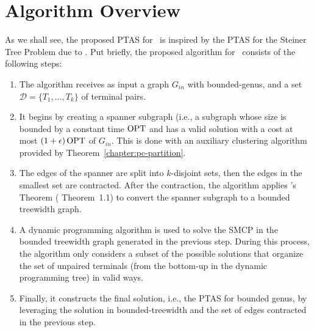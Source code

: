 \section{Algorithm Overview}

As we shall see, the proposed PTAS for \steinercycle\ is inspired by the PTAS for the Steiner Tree Problem due to \cite{Bateni}. Put briefly, the proposed algorithm for \steinercycle\ consists of the following steps:

\begin{enumerate}
    \item The algorithm receives as input a graph \(G_{in}\) with bounded-genus, and a set \(\mathcal{D} = \{T_1, \dots, T_k\}\) of terminal pairs.

    \item It begins by creating a spanner subgraph (i.e., a subgraph whose size is bounded by a constant time \(\operatorname{\textrm{OPT}}\) and has a valid solution with a cost at most \((1 + \epsilon) \operatorname{\textrm{OPT}}\) of \(G_{in}\). This is done with an auxiliary clustering algorithm provided by Theorem~\ref{chapter:pc-partition}.
    
    \item The edges of the spanner are split into \(k\)-disjoint sets, then the edges in the smallest set are contracted. After the contraction, the algorithm applies \citeauthor{Demaine2010}'s Theorem (\cite{Demaine2010} Theorem~1.1) to convert the spanner subgraph to a bounded treewidth graph.

    \item A dynamic programming algorithm is used to solve the SMCP in the bounded treewidth graph generated in the previous step. During this process, the algorithm only considers a subset of the possible solutions that organize the set of unpaired terminals (from the bottom-up in the dynamic programming tree) in valid ways.

    \item Finally, it constructs the final solution, i.e., the PTAS for bounded genus, by leveraging the solution in bounded-treewidth and the set of edges contracted in the previous step.
\end{enumerate}